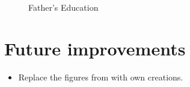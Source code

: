 \begin{figure}[htp]\centering
\caption{Father's Education}
\end{figure}

\FloatBarrier\section{Future improvements}

\begin{itemize}
\item Replace the figures from \citet{Spence.1973} with own creations.
\end{itemize}
